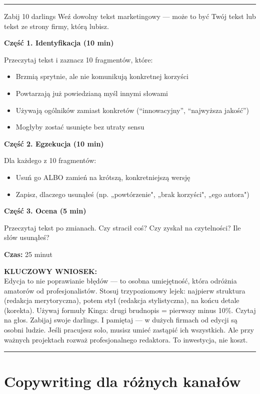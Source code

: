 \documentclass[
  12pt,
  a4paper,
  twoside,
  openright,
  12pt,
  DIV=12,
  BCOR=12mm]{scrbook}
\newcommand{\decoline}{%
  \begin{center}
    \textcolor{bordergray}{\rule{0.3\textwidth}{0.5pt}}
  \end{center}
}
\newcommand{\takeaway}[1]{%
  \begin{tcolorbox}[
    enhanced,
    colback=accentgreen!10,
    colframe=accentgreen,
    boxrule=0pt,
    borderline south={3pt}{0pt}{accentgreen},
    sharp corners,
    left=15pt, right=15pt, top=10pt, bottom=10pt
  ]
    \textbf{\color{accentgreen}KLUCZOWY WNIOSEK:}\\[5pt]
    #1
  \end{tcolorbox}
}
\begin{document}
\decoline

\begin{cwiczenie}{Zabij 10 darlings}
Weź dowolny tekst marketingowy --- może to być Twój tekst lub tekst ze strony firmy, którą lubisz.

\textbf{Część 1. Identyfikacja (10 min)}

Przeczytaj tekst i zaznacz 10 fragmentów, które:
\begin{itemize}
  \item Brzmią sprytnie, ale nie komunikują konkretnej korzyści
  \item Powtarzają już powiedzianą myśl innymi słowami
  \item Używają ogólników zamiast konkretów (``innowacyjny'', ``najwyższa jakość'')
  \item Mogłyby zostać usunięte bez utraty sensu
\end{itemize}

\textbf{Część 2. Egzekucja (10 min)}

Dla każdego z 10 fragmentów:
\begin{itemize}
  \item Usuń go ALBO zamień na krótszą, konkretniejszą wersję
  \item Zapisz, dlaczego usunąłeś (np. „powtórzenie", „brak korzyści", „ego autora")
\end{itemize}

\textbf{Część 3. Ocena (5 min)}

Przeczytaj tekst po zmianach. Czy stracił coś? Czy zyskał na czytelności? Ile słów usunąłeś?

\textbf{Czas:} 25 minut
\end{cwiczenie}

\takeaway{Edycja to nie poprawianie błędów --- to osobna umiejętność, która odróżnia amatorów od profesjonalistów. Stosuj trzypoziomowy lejek: najpierw struktura (redakcja merytoryczna), potem styl (redakcja stylistyczna), na końcu detale (korekta). Używaj formuły Kinga: drugi brudnopis = pierwszy minus 10\%. Czytaj na głos. Zabijaj swoje darlings. I pamiętaj --- w dużych firmach od edycji są osobni ludzie. Jeśli pracujesz solo, musisz umieć zastąpić ich wszystkich. Ale przy ważnych projektach rozważ profesjonalnego redaktora. To inwestycja, nie koszt.}

\decoline


\chapter{Copywriting dla różnych
kanałów}\label{copywriting-dla-ruxf3ux17cnych-kanaux142uxf3w}
\end{document}
